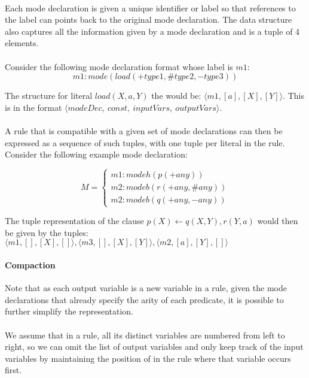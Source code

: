 \documentclass{article}
\theoremstyle{plain}
\theoremstyle{definition}
\begin{document}
\begin{multicols}{2}
\paragraph{} Each mode declaration is given a unique identifier or label so that references to the label can points back to the original mode declaration. The data structure also captures all the information given by a mode declaration and is a tuple of 4 elements.

\paragraph{} Consider the following mode declaration format whose label is $m1$: $$m1: mode(load(+type1, \#type2, -type3))$$

\noindent The structure for literal $load(X, a, Y)$ the would be: $\langle m1, [a], [X], [Y]\rangle$. This is in the format $\langle modeDec,\ const,\ inputVars,\ outputVars \rangle$.

\paragraph{} A rule that is compatible with a given set of mode declarations can then be expressed as a sequence of such tuples, with one tuple per literal in the rule. Consider the following example mode declaration:

\[
M = \begin{cases}
m1: modeh(p(+any))\\
m2: modeb(r(+any, \#any))\\
m2: modeb(q(+any, -any))
\end{cases}
\]

\noindent The tuple representation of the clause $p(X) \leftarrow q(X, Y), r(Y, a)$ would then be given by the tuples: $\langle m1, [], [X], []\rangle, \langle m3, [], [X], [Y] \rangle, \langle m2, [a], [Y], [] \rangle$

\paragraph{Compaction} Note that as each output variable is a new variable in a rule, given the mode declarations that already specify the arity of each predicate, it is possible to further simplify the representation. 

\paragraph{} We assume that in a rule, all its distinct variables are numbered from left to right, so we can omit the list of output variables and only keep track of the input variables by maintaining the position of in the rule where that variable occurs first.


\end{multicols}
\end{document}
